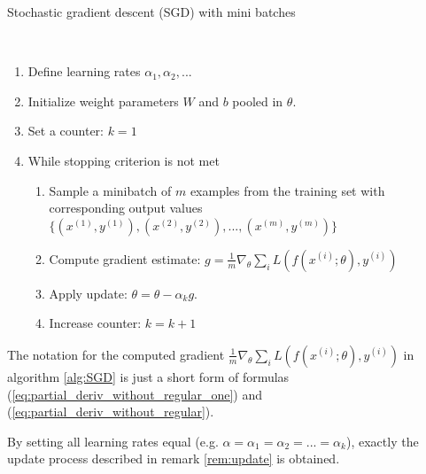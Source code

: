 \begin{algorithm}
	\caption{Stochastic gradient descent (SGD) with mini batches \cite{goodfellow2016deep}}\label{alg:SGD}
	\begin{algorithmic}
		\\
		\begin{enumerate}
			\item Define learning rates $\alpha_1, \alpha_2, ...$
			\item Initialize weight parameters $W$ and $b$ pooled in $\theta$.
			\item Set a counter: $k = 1$
			\item While stopping criterion is not met
			\begin{enumerate}[label=\emph{\alph*})]
				\item Sample a minibatch of $m$ examples from the training set with corresponding output values
				$\{(x^{(1)}, y^{(1)}), (x^{(2)}, y^{(2)}), ..., (x^{(m)}, y^{(m)})\}$
				\item Compute gradient estimate: $g = \frac{1}{m} \nabla_\theta \sum_i L(f(x^{(i)};\theta), y^{(i)})$
				\item Apply update: $\theta = \theta - \alpha_k g$.
				\item Increase counter: $k = k + 1$
			\end{enumerate}
		\end{enumerate}
	\end{algorithmic}
\end{algorithm}

\begin{remark}
	The notation for the computed gradient $\frac{1}{m} \nabla_\theta \sum_i L(f(x^{(i)};\theta), y^{(i)})$ in algorithm \ref{alg:SGD} is just a short form of formulas (\ref{eq:partial_deriv_without_regular_one}) and (\ref{eq:partial_deriv_without_regular}).
\end{remark}

\begin{remark}
	By setting all learning rates equal (e.g. $\alpha = \alpha_1 = \alpha_2 = ... = \alpha_k$), exactly the update process described in remark \ref{rem:update} is obtained.
\end{remark}

